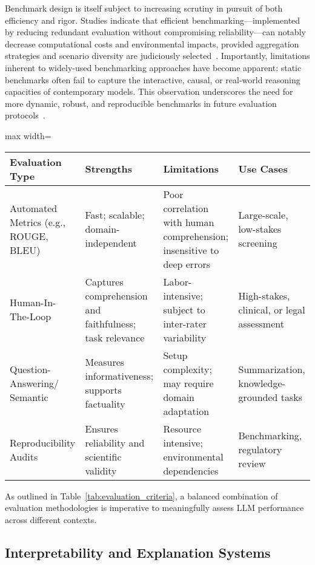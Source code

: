 \documentclass[sigconf]{acmart}
\begin{document}
Benchmark design is itself subject to increasing scrutiny in pursuit of both efficiency and rigor. Studies indicate that efficient benchmarking—implemented by reducing redundant evaluation without compromising reliability—can notably decrease computational costs and environmental impacts, provided aggregation strategies and scenario diversity are judiciously selected~\cite{ref101, ref108}. Importantly, limitations inherent to widely-used benchmarking approaches have become apparent: static benchmarks often fail to capture the interactive, causal, or real-world reasoning capacities of contemporary models. This observation underscores the need for more dynamic, robust, and reproducible benchmarks in future evaluation protocols~\cite{ref76, ref91, ref104}.

\begin{table*}[htbp]
\centering
\caption{Comparison of Model Evaluation Approaches: Key Criteria}
\label{tab:evaluation_criteria}
\begin{adjustbox}{max width=\textwidth}
\begin{tabular}{llll}
\toprule
\textbf{Evaluation Type} & \textbf{Strengths} & \textbf{Limitations} & \textbf{Use Cases} \\
\midrule
Automated Metrics (e.g., ROUGE, BLEU) & Fast; scalable; domain-independent & Poor correlation with human comprehension; insensitive to deep errors & Large-scale, low-stakes screening \\
Human-In-The-Loop & Captures comprehension and faithfulness; task relevance & Labor-intensive; subject to inter-rater variability & High-stakes, clinical, or legal assessment \\
Question-Answering/ Semantic & Measures informativeness; supports factuality & Setup complexity; may require domain adaptation & Summarization, knowledge-grounded tasks \\
Reproducibility Audits & Ensures reliability and scientific validity & Resource intensive; environmental dependencies & Benchmarking, regulatory review \\
\bottomrule
\end{tabular}
\end{adjustbox}
\end{table*}

As outlined in Table~\ref{tab:evaluation_criteria}, a balanced combination of evaluation methodologies is imperative to meaningfully assess LLM performance across different contexts.

\subsection{Interpretability and Explanation Systems}
\end{document}
